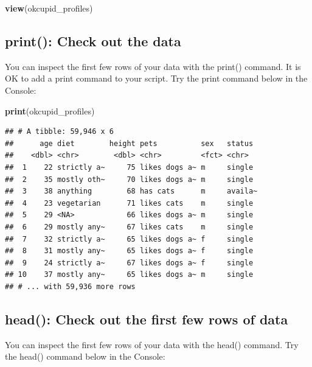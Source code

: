 \documentclass[
]{krantz}
\makeatletter
\newenvironment{Shaded}{\begin{snugshade}}{\end{snugshade}}
\newcommand{\KeywordTok}[1]{\textcolor[rgb]{0.27,0.27,0.27}{\textbf{#1}}}
\newcommand{\NormalTok}[1]{#1}
\newenvironment{kframe}{%
\medskip{}
\setlength{\fboxsep}{.8em}
 \def\at@end@of@kframe{}%
 \ifinner\ifhmode%
  \def\at@end@of@kframe{\end{minipage}}%
  \begin{minipage}{\columnwidth}%
 \fi\fi%
 \def\FrameCommand##1{\hskip\@totalleftmargin \hskip-\fboxsep
 \colorbox{shadecolor}{##1}\hskip-\fboxsep
     \hskip-\linewidth \hskip-\@totalleftmargin \hskip\columnwidth}%
 \MakeFramed {\advance\hsize-\width
   \@totalleftmargin\z@ \linewidth\hsize
   \@setminipage}}%
 {\par\unskip\endMakeFramed%
 \at@end@of@kframe}
\renewenvironment{Shaded}{\begin{kframe}}{\end{kframe}}
\makeatother
\begin{document}
\begin{Shaded}
\begin{Highlighting}[]
\KeywordTok{view}\NormalTok{(okcupid_profiles)}
\end{Highlighting}
\end{Shaded}

\hypertarget{print-check-out-the-data}{%
\subsection{print(): Check out the data}\label{print-check-out-the-data}}

You can inspect the first few rows of your data with the print() command. It is OK to add a print command to your script. Try the print command below in the Console:

\begin{Shaded}
\begin{Highlighting}[]
\KeywordTok{print}\NormalTok{(okcupid_profiles)}
\end{Highlighting}
\end{Shaded}

\begin{verbatim}
## # A tibble: 59,946 x 6
##      age diet        height pets          sex   status 
##    <dbl> <chr>        <dbl> <chr>         <fct> <chr>  
##  1    22 strictly a~     75 likes dogs a~ m     single 
##  2    35 mostly oth~     70 likes dogs a~ m     single 
##  3    38 anything        68 has cats      m     availa~
##  4    23 vegetarian      71 likes cats    m     single 
##  5    29 <NA>            66 likes dogs a~ m     single 
##  6    29 mostly any~     67 likes cats    m     single 
##  7    32 strictly a~     65 likes dogs a~ f     single 
##  8    31 mostly any~     65 likes dogs a~ f     single 
##  9    24 strictly a~     67 likes dogs a~ f     single 
## 10    37 mostly any~     65 likes dogs a~ m     single 
## # ... with 59,936 more rows
\end{verbatim}

\hypertarget{head-check-out-the-first-few-rows-of-data}{%
\subsection{head(): Check out the first few rows of data}\label{head-check-out-the-first-few-rows-of-data}}

You can inspect the first few rows of your data with the head() command. Try the head() command below in the Console:
\end{document}
